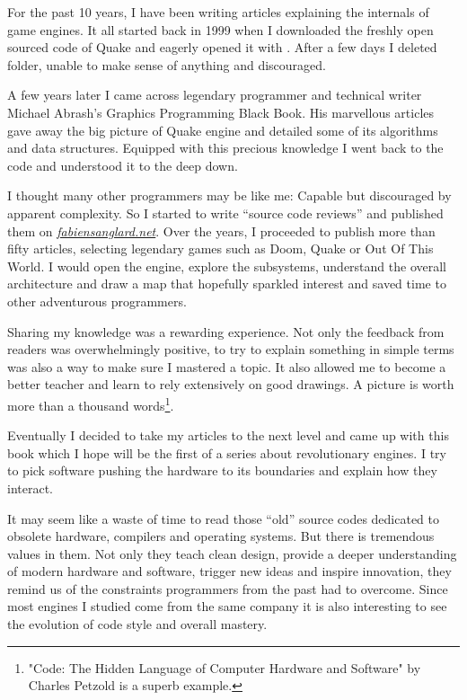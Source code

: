 \documentclass[book.tex]{subfiles}
\begin{document}
For the past 10 years, I have been writing articles explaining the internals of game engines. It all started back in 1999 when I downloaded the freshly open sourced code of \mbox{Quake} and eagerly opened it with . After a few days I deleted  folder, unable to make sense of anything and discouraged.

\bigskip

A few years later I came across legendary programmer and technical writer Michael Abrash's Graphics Programming Black Book. His marvellous articles gave away the big picture of Quake engine and detailed some of its algorithms and data structures. Equipped with this precious knowledge I went back to the code and understood it to the deep down.

\bigskip

I thought many other programmers may be like me: Capable but discouraged by apparent complexity. So I started to write ``source  code reviews'' and published them on 
\href{http://fabiensanglard.net}{\textit{fabiensanglard.net}}. Over the years, I proceeded to publish more than fifty articles, selecting legendary games such as Doom, Quake or Out Of This World. I would open the engine, explore the subsystems, understand the overall architecture and draw a map that hopefully sparkled interest and saved time to other adventurous programmers.

\bigskip

Sharing my knowledge was a rewarding experience. Not only the feedback from readers was overwhelmingly positive, to try to explain something in simple terms was also a way to make sure I mastered a topic. It also allowed me to become a better teacher and learn to rely extensively on good drawings. A picture
is worth more than a thousand words\footnote{"Code: The Hidden Language of Computer Hardware and Software" by Charles Petzold is a superb example.}. 

\bigskip

Eventually I decided to take my articles to the next level and came up with this book which I hope will be the first of a series about revolutionary  engines. I try to pick software pushing the hardware to its boundaries and explain how they interact.

\bigskip

It may seem like a waste of time to read those ``old'' source codes dedicated to obsolete hardware, compilers and operating systems. But there is tremendous values in them. Not only they teach clean design, provide a deeper understanding of modern hardware and software, trigger new ideas and inspire innovation, they remind us of the constraints programmers from the past had to overcome. Since most engines I studied come from the same company it is also interesting to see the evolution of code style and overall mastery.
\end{document}

